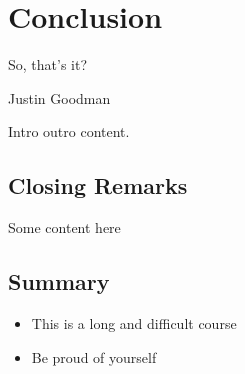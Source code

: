 \documentclass[main.tex]{subfiles}
\begin{document}
\chapter{Conclusion}

\epigraph{So, that's it?}{Justin Goodman}

Intro outro content.

\section{Closing Remarks}

Some content here

\section{Summary}

\begin{itemize}
	\item This is a long and difficult course
	\item Be proud of yourself
\end{itemize}
\end{document}
